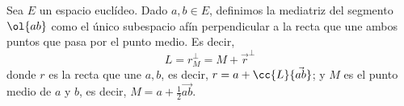 \begin{definicion}[Mediatriz]
    Sea $E$ un espacio euclídeo. Dado $a,b\in E$, definimos la mediatriz del segmento $\ol{ab}$ como el único subespacio afín perpendicular a la recta que une ambos puntos que pasa por el punto medio. Es decir,
    $$L=r^\perp_M = M + \vec{r}^\perp$$
    donde $r$ es la recta que une $a,b$, es decir, $r=a+\cc{L}\{\vec{ab}\}$; y $M$ es el punto medio de $a$ y $b$, es decir, $M=a+\frac{1}{2}\vec{ab}$.
    \begin{figure}[H]
        \centering
    \end{figure}
\end{definicion}


